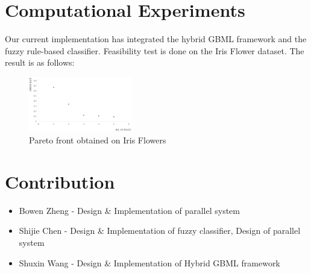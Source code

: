 \documentclass[conference]{IEEEtran}
\begin{document}
  \section{Computational Experiments}
	 Our current implementation has integrated the hybrid GBML framework and the fuzzy rule-based classifier. Feasibility test is done on the Iris Flower dataset. The result is as follows:
 \begin{figure}[H]
 	\centering
 	\includegraphics[width=0.4\textwidth]{figures/iris.png}
 	\caption{Pareto front obtained on Iris Flowers}\label{fig:digit}
 \end{figure}

  \section{Contribution}
  
    \begin{itemize}
    \item Bowen Zheng - Design \& Implementation of parallel system
    \item Shijie Chen - Design \& Implementation of fuzzy classifier, Design of parallel system
    \item Shuxin Wang - Design \& Implementation of Hybrid GBML framework
    \end{itemize}
    





\end{document}
